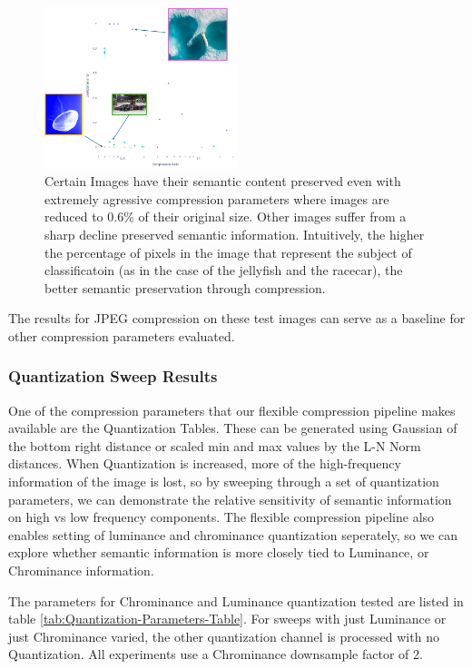 \begin{figure}
    \includegraphics[width=0.5\textwidth]{assets/JPEG Baseline Compression with Examples}
    \caption{Certain Images have their semantic content preserved even with extremely agressive compression parameters where images are reduced to 0.6\% of their original size. Other images suffer from a sharp decline preserved semantic information. Intuitively, the higher the percentage of pixels in the image that represent the subject of classificatoin (as in the case of the jellyfish and the racecar), the better semantic preservation through compression.}
    \label{fig:Annotated JPEG Baseline}
\end{figure}

The results for JPEG compression on these test images can serve as a baseline for other compression parameters evaluated.

\subsubsection{Quantization Sweep Results}

One of the compression parameters that our flexible compression pipeline makes available are the Quantization Tables.
These can be generated using Gaussian of the bottom right distance or scaled min and max values by the L-N Norm distances.
When Quantization is increased, more of the high-frequency information of the image is lost, so by sweeping through a set of quantization parameters, we can demonstrate the relative sensitivity of semantic information on high vs low frequency components.
The flexible compression pipeline also enables setting of luminance and chrominance quantization seperately, so we can explore whether semantic information is more closely tied to Luminance, or Chrominance information.

The parameters for Chrominance and Luminance quantization tested are listed in table \ref{tab:Quantization-Parameters-Table}. For sweeps with just Luminance or just Chrominance varied, the other quantization channel is processed with no Quantization.
All experiments use a Chrominance downsample factor of 2.


